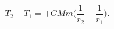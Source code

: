 \documentclass[12pt,preview]{standalone}
\begin{document}
\begin{preview}
\begin{equation}
\label{Eq:I:13:12}
T_2-T_1=+GMm\biggr(\frac{1}{r_2}-\frac{1}{r_1}\biggr).
\end{equation}
\end{preview}
\end{document}
